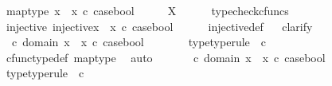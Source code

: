 \begin{isabellebody}
\ map{\isacharunderscore}{\kern0pt}type{\isacharcolon}{\kern0pt}\ {\isachardoublequoteopen}{\isacharparenleft}{\kern0pt}x{}\ {\isasymamalg}\ x{}{\isacharparenright}{\kern0pt}\ {\isasymcirc}\isactrlsub c\ case{\isacharunderscore}{\kern0pt}bool\ \ \ {\isacharcolon}{\kern0pt}\ {\isasymOmega}\ {\isasymrightarrow}\ X{\isachardoublequoteclose}\isanewline
\ \ \ \ \isamarkupfalse%
\ typecheck{\isacharunderscore}{\kern0pt}cfuncs\isanewline
\ \ \isamarkupfalse%
\ injective{\isacharcolon}{\kern0pt}\ {\isachardoublequoteopen}injective{\isacharparenleft}{\kern0pt}{\isacharparenleft}{\kern0pt}x{}\ {\isasymamalg}\ x{}{\isacharparenright}{\kern0pt}\ {\isasymcirc}\isactrlsub c\ case{\isacharunderscore}{\kern0pt}bool{\isacharparenright}{\kern0pt}{\isachardoublequoteclose}\isanewline
\ \ \ \ \isamarkupfalse%
\ injective{\isacharunderscore}{\kern0pt}def\isanewline
\ \ \isamarkupfalse%
{\isacharparenleft}{\kern0pt}clarify{\isacharparenright}{\kern0pt}\isanewline
\ \ \ \ \isamarkupfalse%
\ {\isasymomega}{}\ {\isasymomega}{}\ \isanewline
\ \ \ \ \isamarkupfalse%
\ {\isachardoublequoteopen}{\isasymomega}{}\ {\isasymin}\isactrlsub c\ domain\ {\isacharparenleft}{\kern0pt}x{}\ {\isasymamalg}\ x{}\ {\isasymcirc}\isactrlsub c\ case{\isacharunderscore}{\kern0pt}bool{\isacharparenright}{\kern0pt}{\isachardoublequoteclose}\isanewline
\ \ \ \ \isamarkupfalse%
\ \isamarkupfalse%
\ {\isasymomega}{}{\isacharunderscore}{\kern0pt}type{\isacharbrackleft}{\kern0pt}type{\isacharunderscore}{\kern0pt}rule{\isacharbrackright}{\kern0pt}{\isacharcolon}{\kern0pt}\ {\isachardoublequoteopen}{\isasymomega}{}\ {\isasymin}\isactrlsub c\ {\isasymOmega}{\isachardoublequoteclose}\isanewline
\ \ \ \ \ \ \isamarkupfalse%
\ cfunc{\isacharunderscore}{\kern0pt}type{\isacharunderscore}{\kern0pt}def\ map{\isacharunderscore}{\kern0pt}type\ \isamarkupfalse%
\ auto\isanewline
\ \ \ \ \isamarkupfalse%
\ {\isachardoublequoteopen}{\isasymomega}{}\ {\isasymin}\isactrlsub c\ domain\ {\isacharparenleft}{\kern0pt}x{}\ {\isasymamalg}\ x{}\ {\isasymcirc}\isactrlsub c\ case{\isacharunderscore}{\kern0pt}bool{\isacharparenright}{\kern0pt}{\isachardoublequoteclose}\isanewline
\ \ \ \ \isamarkupfalse%
\ \isamarkupfalse%
\ {\isasymomega}{}{\isacharunderscore}{\kern0pt}type{\isacharbrackleft}{\kern0pt}type{\isacharunderscore}{\kern0pt}rule{\isacharbrackright}{\kern0pt}{\isacharcolon}{\kern0pt}\ {\isachardoublequoteopen}{\isasymomega}{}\ {\isasymin}\isactrlsub c\ {\isasymOmega}{\isachardoublequoteclose}\isanewline

\end{isabellebody}
